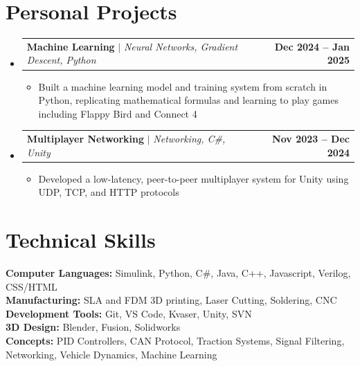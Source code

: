 \documentclass[letterpaper,11pt]{article}
\makeatletter
\newcommand{\resumeItem}[1]{
  \item\normalsize{
    {#1 \vspace{-2pt}}
  }
}
\newcommand{\resumeProjectHeading}[2]{
    \item
    \begin{tabular*}{1.001\textwidth}{l@{\extracolsep{\fill}}r}
      \normalsize#1 & \textbf{\normalsize #2}\\
    \end{tabular*}\vspace{-7pt}
}
\newcommand{\resumeSubHeadingListStart}{\begin{itemize}[leftmargin=0.0in, label={}]}
\newcommand{\resumeSubHeadingListEnd}{\end{itemize}}
\newcommand{\resumeItemListStart}{\begin{itemize}}
\newcommand{\resumeItemListEnd}{\end{itemize}\vspace{-5pt}}
\makeatother
\begin{document}
\section{Personal Projects}
    \vspace{-5pt}
    \resumeSubHeadingListStart
      \resumeProjectHeading
          {\textbf{Machine Learning} $|$ \emph{Neural Networks, Gradient Descent, Python}}{Dec 2024 -- Jan 2025}
          \resumeItemListStart 
            \resumeItem{Built a machine learning model and training system from scratch in Python, replicating mathematical formulas and learning to play games including Flappy Bird and Connect 4}
          \resumeItemListEnd
          \vspace{-16pt}
      \resumeProjectHeading
          {\textbf{Multiplayer Networking} $|$ \emph{Networking, C\#, Unity}}{Nov 2023 -- Dec 2024}
          \resumeItemListStart
            \resumeItem{Developed a low-latency, peer-to-peer multiplayer system for Unity using UDP, TCP, and HTTP protocols}
          \resumeItemListEnd
          \vspace{-16pt}
    \resumeSubHeadingListEnd
\vspace{5pt} 


\section{Technical Skills}
 \begin{itemize}[leftmargin=0.15in, label={}]
    \normalsize{\item{
     \textbf{Computer Languages:}{ Simulink, Python, C\#, Java, C++, Javascript, Verilog, CSS/HTML} \\
     \textbf{Manufacturing:}{ SLA and FDM 3D printing, Laser Cutting, Soldering, CNC} \\
     \textbf{Development Tools:}{ Git, VS Code, Kvaser, Unity, SVN} \\
     \textbf{3D Design:}{ Blender, Fusion, Solidworks} \\
     \textbf{Concepts:}{ PID Controllers, CAN Protocol, Traction Systems, Signal Filtering, Networking, Vehicle Dynamics, Machine Learning} }}
 \end{itemize}
 \vspace{-16pt} 
\end{document}
